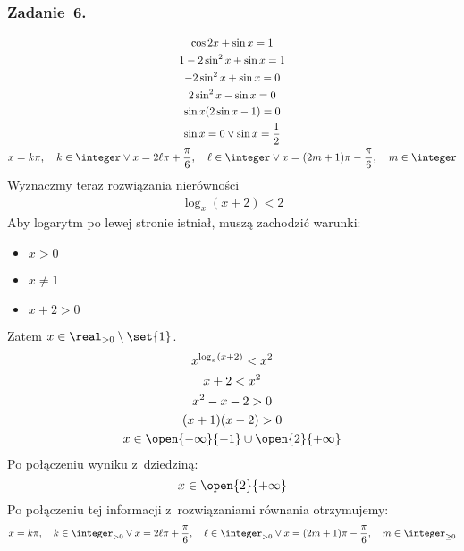 \subsubsection*{Zadanie~6.}
\begin{gather*}
    \cos 2x + \sin x = 1\\
    1 - 2\sin^2x + \sin x = 1\\
    -2\sin^2x + \sin x = 0\\
    2\sin^2x - \sin x = 0\\
    \sin x(2\sin x - 1) = 0\\
    \sin x = 0 \lor \sin x = \frac{1}{2}\\
    x = k\pi,\quad k \in \integer \lor x = 2\ell\pi + \frac{\pi}{6},\quad \ell \in \integer \lor x = (2m + 1)\pi - \frac{\pi}{6},\quad m \in \integer
\end{gather*}
Wyznaczmy teraz rozwiązania nierówności
\begin{gather*}
    \log_x (x + 2) < 2
\end{gather*}
Aby logarytm po lewej stronie istniał, muszą zachodzić warunki:
\begin{itemize}
    \item \(x > 0\)
    \item \(x \neq 1\)
    \item \(x + 2 > 0\)
\end{itemize}
Zatem \(x \in \real_{> 0} \setminus \set{1}\).
\begin{gather*}
    x^{\log_x (x + 2)} < x^2\\
    x + 2 < x^2\\
    x^2 - x - 2 > 0\\
    (x + 1)(x - 2) > 0\\
    x \in \open{-\infty}{-1} \cup \open{2}{+\infty}
\end{gather*}
Po połączeniu wyniku z~dziedziną:
\begin{equation*}
    x \in \open{2}{+\infty}
\end{equation*}
Po połączeniu tej informacji z~rozwiązaniami równania otrzymujemy:
\begin{equation*}
    x = k\pi,\quad k \in \integer_{> 0} \lor x = 2\ell\pi + \frac{\pi}{6},\quad \ell \in \integer_{> 0} \lor x = (2m + 1)\pi - \frac{\pi}{6},\quad m \in \integer_{\geq 0}
\end{equation*}
